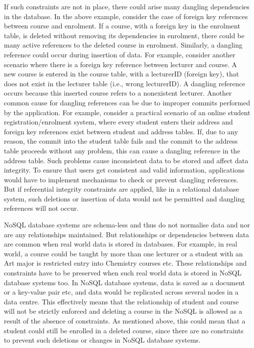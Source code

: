 If such constraints are not in place, there could arise many dangling
dependencies in the database. In the above example, consider the case of foreign
key references between course and enrolment. If a course, with a foreign key in
the enrolment table, is deleted without removing its dependencies in enrolment,
there could be many active references to the deleted course in enrolment.
Similarly, a dangling reference could occur during insertion of data. For
example, consider another scenario where there is a foreign key reference
between lecturer and course. A new course is entered in the course table, with a
lecturerID (foreign key), that does not exist in the lecturer table (i.e., wrong
lecturerID). A dangling reference occurs because this inserted course refers to
a nonexistent lecturer. Another common cause for dangling references can be due
to improper commits performed by the application. For example, consider a
practical scenario of an online student registration/enrolment system, where
every student enters their address and foreign key references exist between
student and address tables. If, due to any reason, the commit into the student
table fails and the commit to the address table proceeds without any problem,
this can cause a dangling reference in the address table. Such problems cause
inconsistent data to be stored and affect data integrity. To ensure that users
get consistent and valid information, applications would have to implement
mechanisms to check or prevent dangling references. But if referential integrity
constraints are applied, like in a relational database system, such deletions or
insertion of data would not be permitted and dangling references will not occur.

\ac{NoSQL} database systems are schema-less and thus do not normalise data and nor
are any relationships maintained. But relationships or dependencies between data
are common when real world data is stored in databases. For example, in real
world, a course could be taught by more than one lecturer or a student with an
Art major is restricted entry into Chemistry courses etc. These relationships
and constraints have to be preserved when such real world data is stored in
\ac{NoSQL} database systems too. In \ac{NoSQL} database systems, data is saved as a
document or a key-value pair etc, and data would be replicated across several
nodes in a data centre. This effectively means that the relationship of student
and course will not be strictly enforced and deleting a course in the \ac{NoSQL} is
allowed as a result of the absence of constraints. As mentioned above, this
could mean that a student could still be enrolled in a deleted course, since
there are no constraints to prevent such deletions or changes in \ac{NoSQL} database
systems.

